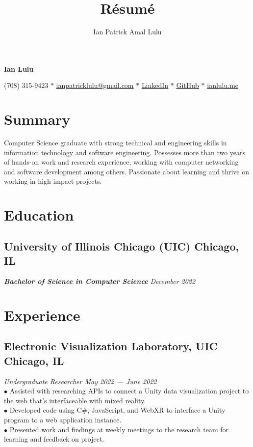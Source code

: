 \documentclass{article}
\makeatletter
\renewcommand{\maketitle}{
    \begin{center}
    {\bfseries\huge
    Ian Lulu}
    
    \vspace{0.25em}

    (708) 315-9423 {$\ast$} \href{mailto:ianpatricklulu@gmail.com}{\underline{ianpatricklulu@gmail.com}} {$\ast$} \href{https://www.linkedin.com/in/ianlulu/}{\underline{LinkedIn}} {$\ast$} \href{https://github.com/IanLulu}{\underline{GitHub}} {$\ast$} \url{ianlulu.me}
    
    \end{center}
}
\makeatother
\begin{document}
\title{R\'esum\'e}
\author{Ian Patrick Amal Lulu}


\maketitle
{} %


\section{Summary}
Computer Science graduate with strong technical and engineering skills in information technology and software engineering.
Possesses more than two years of hands-on work and research experience, working with computer networking and software development among others.
Passionate about learning and thrive on working in high-impact projects.


\section{Education}
\subsection{University of Illinois Chicago (UIC) \hfill \textnormal{Chicago, IL}}
\vspace{-0.5em}
\textit{\textbf{Bachelor of Science in Computer Science} \hfill December 2022}


\section{Experience}
\subsection{Electronic Visualization Laboratory, UIC \hfill \textnormal{Chicago, IL}}
\vspace{-0.5em}
\textit{Undergraduate Researcher \hfill May 2022 --- June 2022}
\\
$\bullet$ Assisted with researching APIs to connect a Unity data visualization project to the web that's interfaceable with mixed reality.
\\
$\bullet$ Developed code using C\#, JavaScript, and WebXR to interface a Unity program to a web application instance.
\\
$\bullet$ Presented work and findings at weekly meetings to the research team for learning and feedback on project.
\end{document}
